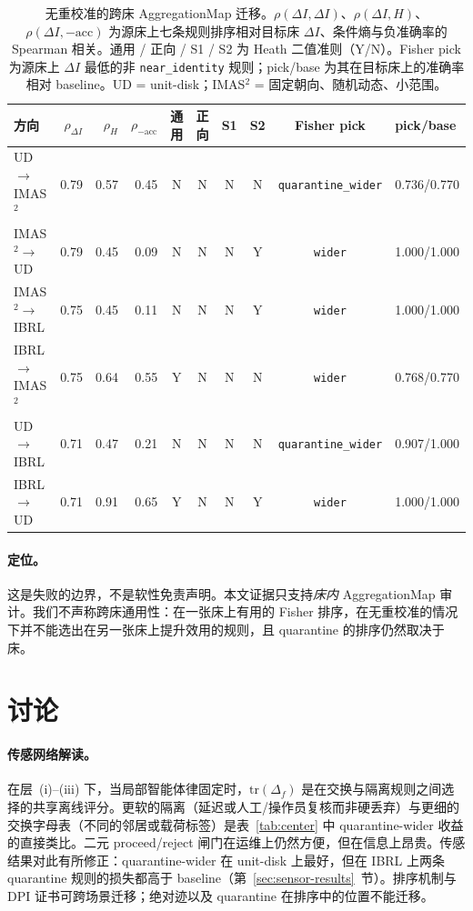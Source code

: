 \documentclass[11pt,a4paper]{article}
\begin{document}
\begin{table}[t]
\centering
\footnotesize
\caption{无重校准的跨床 AggregationMap 迁移。$\rho(\Delta I,\Delta I)$、$\rho(\Delta I,H)$、$\rho(\Delta I,-\mathrm{acc})$ 为源床上七条规则排序相对目标床 $\Delta I$、条件熵与负准确率的 Spearman 相关。通用 / 正向 / S1 / S2 为 Heath 二值准则（Y/N）。Fisher pick 为源床上 $\Delta I$ 最低的非 \texttt{near\_identity} 规则；pick/base 为其在目标床上的准确率相对 baseline。UD = unit-disk；IMAS$^2$ = 固定朝向、随机动态、小范围。}
\label{tab:cross-bed}
\begin{tabular}{lrrrcccccl}
\toprule
方向 & $\rho_{\Delta I}$ & $\rho_H$ & $\rho_{-\mathrm{acc}}$ & 通用 & 正向 & S1 & S2 & Fisher pick & pick/base \\
\midrule
UD$\to$IMAS$^2$ & 0.79 & 0.57 & 0.45 & N & N & N & N & \texttt{quarantine\_wider} & 0.736/0.770 \\
IMAS$^2\to$UD & 0.79 & 0.45 & 0.09 & N & N & N & Y & \texttt{wider} & 1.000/1.000 \\
IMAS$^2\to$IBRL & 0.75 & 0.45 & 0.11 & N & N & N & Y & \texttt{wider} & 1.000/1.000 \\
IBRL$\to$IMAS$^2$ & 0.75 & 0.64 & 0.55 & Y & N & N & N & \texttt{wider} & 0.768/0.770 \\
UD$\to$IBRL & 0.71 & 0.47 & 0.21 & N & N & N & N & \texttt{quarantine\_wider} & 0.907/1.000 \\
IBRL$\to$UD & 0.71 & 0.91 & 0.65 & Y & N & N & Y & \texttt{wider} & 1.000/1.000 \\
\bottomrule
\end{tabular}
\end{table}

\paragraph{定位。}
这是失败的边界，不是软性免责声明。本文证据只支持\emph{床内} AggregationMap 审计。我们不声称跨床通用性：在一张床上有用的 Fisher 排序，在无重校准的情况下并不能选出在另一张床上提升效用的规则，且 quarantine 的排序仍然取决于床。

\section{讨论}
\label{sec:discussion}

\paragraph{传感网络解读。}
在层~(i)--(iii) 下，当局部智能体律固定时，$\mathrm{tr}(\Delta_f)$ 是在交换与隔离规则之间选择的共享离线评分。更软的隔离（延迟或人工/操作员复核而非硬丢弃）与更细的交换字母表（不同的邻居或载荷标签）是表~\ref{tab:center} 中 quarantine-wider 收益的直接类比。二元 proceed/reject 闸门在运维上仍然方便，但在信息上昂贵。传感结果对此有所修正：quarantine-wider 在 unit-disk 上最好，但在 IBRL 上两条 quarantine 规则的损失都高于 baseline（第~\ref{sec:sensor-results}~节）。排序机制与 DPI 证书可跨场景迁移；绝对迹以及 quarantine 在排序中的位置不能迁移。
\end{document}
